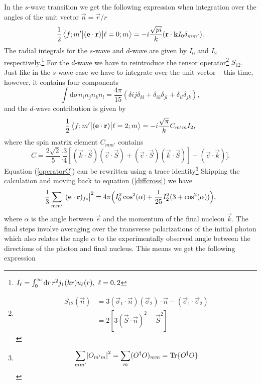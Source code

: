 In the $s$-wave transition we get the following expression when integration over the angles of the unit vector $\vec{n}=\vec{r}/r$
\begin{equation}
    \frac{1}{2}\mel{f;m'}{(\bm{\mathrm{e}}\cdot\bm{\mathrm{r}})}{\ell=0;m} = -i\frac{\sqrt{pi}}{k} (\bm{\mathrm{r}}\cdot\bm{\mathrm{k}} I_0 \delta_{mm'}).
\end{equation}
The radial integrals for the $s$-wave and $d$-wave are given by $I_0$ and $I_2$ respectively.\footnote{$I_\ell = \int_0^\infty \textrm{d}r \, r^2 j_1(kr)u_\ell(r), \\ \, \, \ell=0,2$}
For the $d$-wave we have to reintroduce the tensor operator\footnote{\begin{align*}
    S_{12}(\vec{n})&=3(\vec{\sigma}_1\cdot \vec{n})(\vec{\sigma}_2)\cdot\vec{n}-(\vec{\sigma}_1\cdot\vec{\sigma}_2) \\
    &= 2[3(\vec{S}\cdot\vec{n})^2-\vec{S}^2]
\end{align*}} $S_12$. Just like in the $s$-wave case we have to integrate over the unit vector -- this time, however, it contains four components
\begin{equation}
    \int \textrm{d}o \, n_i n_j n_k n_l = \frac{4\pi}{15}(\delta{ij}\delta_{kl}+\delta_{ik}\delta_{jl}+\delta_{il}\delta_{jk}),
\end{equation}
and the $d$-wave contribution is given by
\begin{equation}
    \frac{1}{2}\mel{f;m'}{(\bm{\mathrm{e}}\cdot \bm{\mathrm{r}})}{\ell=2;m} = -i\frac{\sqrt{\pi}}{k}C_{m'm}I_2,
\end{equation}
where the spin matrix element $C_{mm'}$ contains
\begin{equation}\label{operatorC}
    C= \frac{2\sqrt{2}}{5} \Big[ \frac{3}{4}\left[ (\vec{k}\cdot \vec{S})(\vec{e}\cdot \vec{S})+(\vec{e}\cdot \vec{S})(\vec{k}\cdot \vec{S})\right] -(\vec{e}\cdot \vec{k}) \Big].
\end{equation}
Equation (\ref{operatorC}) can be rewritten using a trace identity\footnote{\begin{align*}
    \sum_{mm'}\abs{O_{m'm}}^2=\sum_m (O^\dagger O)_{mm} = \text{Tr}\{ O^\dagger O \}
\end{align*}}
Skipping the calculation and moving back to equation (\ref{diffcross}) we have
\begin{equation}
    \frac{1}{3} \sum_{mm'} \abs{(\bm{\mathrm{e}}\cdot \bm{\mathrm{r}})_{fi}}^2 = 4\pi \Big(I_0^2\cos^2(\alpha) + \frac{1}{25}I_2^2(3+\cos^2(\alpha)) \Big),
\end{equation}
where $\alpha$ is the angle between $\vec{e}$ and the momentum of the final nucleon $\vec{k}$. The final steps involve averaging over the transverse polarizations of the initial photon which also relates the angle $\alpha$ to the experimentally observed angle between the directions of the photon and final nucleus. This means we get the following expression
